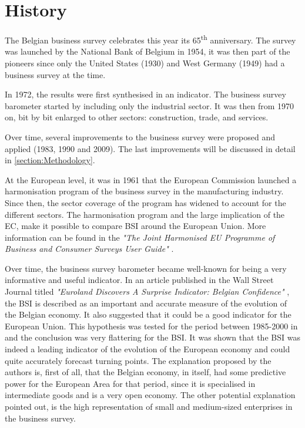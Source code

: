 \documentclass[12pt,a4paper,oneside]{book}
\begin{document}
\section{History}

The Belgian business survey celebrates this year its 65\textsuperscript{th} anniversary. The survey was launched by the National Bank of Belgium in 1954, it was then part of the pioneers since only the United States (1930) and West Germany (1949) had a business survey at the time.

In 1972, the results were first synthesised in an indicator.
The business survey barometer started by including only the industrial sector. It was then from 1970 on, bit by bit enlarged to other sectors: construction, trade, and services.

Over time, several improvements to the business survey were proposed and applied (1983, 1990 and 2009). The last improvements will be discussed in detail in \autoref{section:Methodology}.

At the European level, it was in 1961 that the European Commission launched a harmonisation program of the business survey in the manufacturing industry. 
Since then, the sector coverage of the program has widened to account for the different sectors.
The harmonisation program and the large implication of the EC, make it possible to compare BSI around the European Union.
More information can be found in the \textit{"The Joint Harmonised EU Programme of Business and Consumer Surveys User Guide"} \cite{european_commission_joint_2016}.

Over time, the business survey barometer became well-known for being a very informative and useful indicator. 
In an article published in the Wall Street Journal titled \textit{"Euroland Discovers A Surprise Indicator: Belgian Confidence"} \citep{rhoads_euroland_1999}, the BSI is described as an important and accurate measure of the evolution of the Belgian economy. 
It also suggested that it could be a good indicator for the European Union. 
This hypothesis was tested for the period between 1985-2000 in \cite{vanhaelen_belgian_2000} and the conclusion was very flattering for the BSI. 
It was shown that the BSI was indeed a leading indicator of the evolution of the European economy and could quite accurately forecast turning points. 
The explanation proposed by the authors is, first of all, that the Belgian economy, in itself, had some predictive power for the European Area for that period, since it is specialised in intermediate goods and is a very open economy. 
The other potential explanation pointed out, is the high representation of small and medium-sized enterprises in the business survey.
\end{document}
